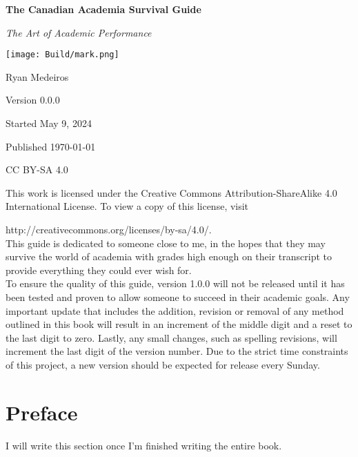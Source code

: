 \documentclass{book}
\begin{document}
\frontmatter
	\newcommand*{\titles}[7]
	{
	\begin{titlepage}
	\centering
	\bfseries \Huge  #1	\par
	\vspace{1.0cm}
	\itshape  \Large #2	\par

	\vspace{1.0cm}

	\texttt{[image: Build/mark.png]}

	\vfill\raggedleft\normalsize 

	#3	\par
	#4	\par
	#5	\par
	#6	\par
	#7	\par
	\end{titlepage}
	}
	\titles{The Canadian Academia Survival Guide}{The Art of Academic Performance}{Ryan Medeiros}{Version 0.0.0}{Started May 9, 2024}{Published \today}{CC BY-SA 4.0}

This work is licensed under the Creative Commons Attribution-ShareAlike 4.0 International License. To view a copy of this license, visit

\noindent http://creativecommons.org/licenses/by-sa/4.0/. \\

This guide is dedicated to someone close to me, in the hopes that they may survive the world of academia with grades high enough on their transcript to provide everything they could ever wish for. \\

To ensure the quality of this guide, version 1.0.0 will not be released until it has been tested and proven to allow someone to succeed in their academic goals. Any important update that includes the addition, revision or removal of any method outlined in this book will result in an increment of the middle digit and a reset to the last digit to zero. Lastly, any small changes, such as spelling revisions, will increment the last digit of the version number. Due to the strict time constraints of this project, a new version should be expected for release every Sunday.  

\hfill\vfill

\chapter{Preface}

I will write this section once I'm finished writing the entire book. 

\tableofcontents
\mainmatter
\setlength{\parskip}{0.5 cm}








\end{document}
